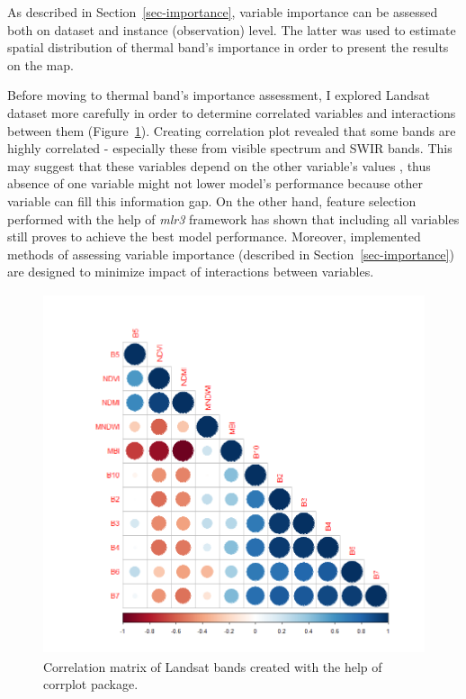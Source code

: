 \documentclass{amuthesis}
\begin{document}
As described in Section~\ref{sec-importance}, variable importance can be
assessed both on dataset and instance (observation) level. The latter
was used to estimate spatial distribution of thermal band's importance
in order to present the results on the map.

Before moving to thermal band's importance assessment, I explored
Landsat dataset more carefully in order to determine correlated
variables and interactions between them (Figure~\ref{fig-rycina19}).
Creating correlation plot revealed that some bands are highly correlated
- especially these from visible spectrum and SWIR bands. This may
suggest that these variables depend on the other variable's values
\autocite{biecek_explanatory_2021}, thus absence of one variable might
not lower model's performance because other variable can fill this
information gap. On the other hand, feature selection performed with the
help of \emph{mlr3} framework \autocite{R-mlr3} has shown that including
all variables still proves to achieve the best model performance.
Moreover, implemented methods of assessing variable importance
(described in Section~\ref{sec-importance}) are designed to minimize
impact of interactions between variables.

\begin{figure}[H]

{\centering \includegraphics[width=4.45833in,height=4.16667in]{./figures/corrplot.png}

}

\caption{\label{fig-rycina19}Correlation matrix of Landsat bands created
with the help of corrplot package.}

\end{figure}
\end{document}
